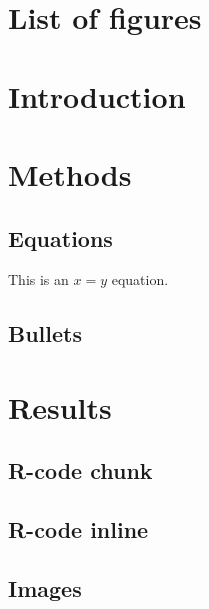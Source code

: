 \documentclass[
  letterpaper,
  landscape]{article}
\begin{document}
\listoftables

\newpage

\hypertarget{list-of-figures}{%
\section*{List of figures}\label{list-of-figures}}

\renewcommand{\listfigurename}{}
\listoffigures

\newpage


\hypertarget{intro}{%
\section{Introduction}\label{intro}}

\hypertarget{meths}{%
\section{Methods}\label{meths}}

\hypertarget{equations}{%
\subsection{Equations}\label{equations}}

This is an \(x=y\) equation.

\hypertarget{bullets}{%
\subsection{Bullets}\label{bullets}}

\hypertarget{res}{%
\section{Results}\label{res}}

\hypertarget{r-code-chunk}{%
\subsection{R-code chunk}\label{r-code-chunk}}

\hypertarget{r-code-inline}{%
\subsection{R-code inline}\label{r-code-inline}}

\hypertarget{images}{%
\subsection{Images}\label{images}}
\end{document}
